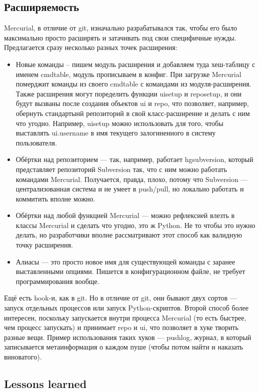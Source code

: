 \documentclass[a5paper]{article}
\begin{document}
\subsection{Расширяемость}

Mercurial, в отличие от git, изначально разрабатывался так, чтобы его было максимально просто расширять и затачивать под свои специфичные нужды. Предлагается сразу несколько разных точек расширения:

\begin{itemize}
	\item Новые команды -- пишем модуль расширения и добавляем туда хеш-таблицу с именем cmdtable, модуль прописываем в конфиг. При загрузке Mercurial померджит команды из своего cmdtable с командами из модуля-расширения. Также расширения могут поределить функции uisetup и reposetup, и они будут вызваны после создания объектов ui и repo, что позволяет, например, обернуть стандартынй репозиторий в свой класс-расширение и делать с ним что угодно. Например, uisetup можно использовать для того, чтобы выставлять ui.username в имя текущего залогиненного в систему пользователя.
	\item Обёртки над репозиторием --- так, например, работает hgsubversion, который представляет репозиторий Subversion так, что с ним можно работать командами Mercurial. Получается, правда, плохо, потому что Subversion --- централизованная система и не умеет в push/pull, но локально работать и коммитить вполне можно.
	\item Обёртки над любой функцией Mercurial --- можно рефлексией влезть в классы Mercurial и сделать что угодно, это ж Python. Не то чтобы это нужно делать, но разработчики вполне рассматривают этот способ как валидную точку расширения.
	\item Алиасы --- это просто новое имя для существующей команды с заранее выставленными опциями. Пишется в конфигурационном файле, не требует программирования вообще.
\end{itemize}

Ещё есть hook-и, как в git. Но в отличие от git, они бывают двух сортов --- запуск отдельных процессов или запуск Python-скриптов. Второй способ более интересен, поскольку запускается внутри процесса Mercurial (то есть быстрее, чем процесс запускать) и принимает repo и ui, что позволяет в хуке творить разные вещи. Пример использования таких хуков --- pushlog, журнал, в который записывается метаинформация о каждом пуше (чтобы потом найти и наказать виноватого).

\subsection{Lessons learned}
\end{document}
